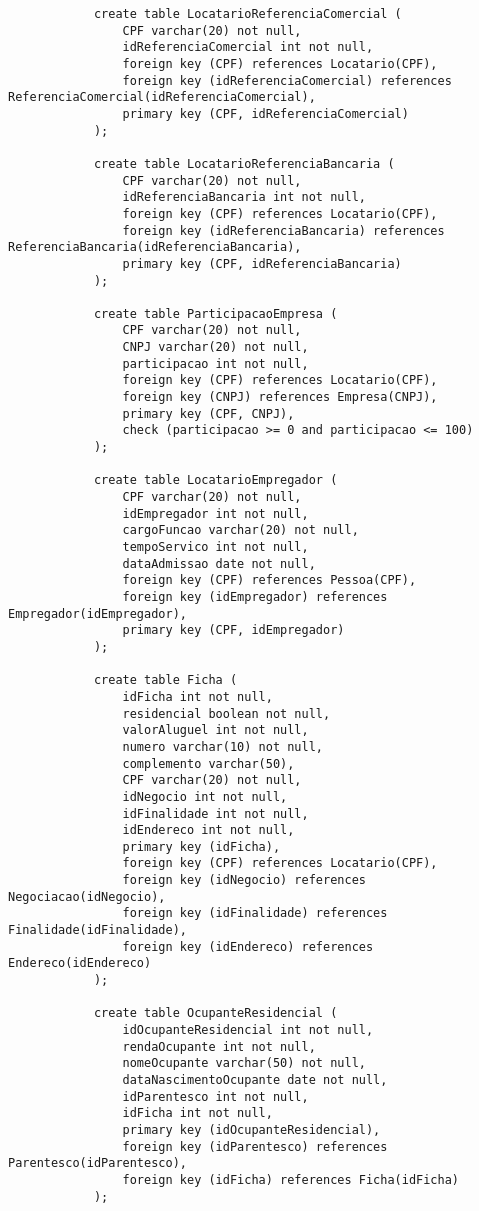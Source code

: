 \documentclass{article}
\begin{document}
\begin{lstlisting}
            create table LocatarioReferenciaComercial (
            	CPF varchar(20) not null,
            	idReferenciaComercial int not null,
            	foreign key (CPF) references Locatario(CPF),
            	foreign key (idReferenciaComercial) references ReferenciaComercial(idReferenciaComercial),
            	primary key (CPF, idReferenciaComercial)
            );
            
            create table LocatarioReferenciaBancaria (
            	CPF varchar(20) not null,
            	idReferenciaBancaria int not null,
            	foreign key (CPF) references Locatario(CPF),
            	foreign key (idReferenciaBancaria) references ReferenciaBancaria(idReferenciaBancaria),
            	primary key (CPF, idReferenciaBancaria)
            );
            
            create table ParticipacaoEmpresa (
            	CPF varchar(20) not null,
            	CNPJ varchar(20) not null,
            	participacao int not null,
            	foreign key (CPF) references Locatario(CPF),
            	foreign key (CNPJ) references Empresa(CNPJ),
            	primary key (CPF, CNPJ),
            	check (participacao >= 0 and participacao <= 100)
            );
            
            create table LocatarioEmpregador (
            	CPF varchar(20) not null,
            	idEmpregador int not null,
            	cargoFuncao varchar(20) not null,
            	tempoServico int not null,
            	dataAdmissao date not null,
            	foreign key (CPF) references Pessoa(CPF),
            	foreign key (idEmpregador) references Empregador(idEmpregador),
            	primary key (CPF, idEmpregador)
            );
            
            create table Ficha (
            	idFicha int not null,
            	residencial boolean not null,
            	valorAluguel int not null,
            	numero varchar(10) not null,
            	complemento varchar(50),
            	CPF varchar(20) not null,
            	idNegocio int not null,
            	idFinalidade int not null,
            	idEndereco int not null,
            	primary key (idFicha),
            	foreign key (CPF) references Locatario(CPF),
            	foreign key (idNegocio) references Negociacao(idNegocio),
            	foreign key (idFinalidade) references Finalidade(idFinalidade),
            	foreign key (idEndereco) references Endereco(idEndereco)
            );
            
            create table OcupanteResidencial (
            	idOcupanteResidencial int not null,
            	rendaOcupante int not null,
            	nomeOcupante varchar(50) not null,
            	dataNascimentoOcupante date not null,
            	idParentesco int not null,
            	idFicha int not null,
            	primary key (idOcupanteResidencial),
            	foreign key (idParentesco) references Parentesco(idParentesco),
            	foreign key (idFicha) references Ficha(idFicha)
            );
            

\end{lstlisting}
\end{document}

